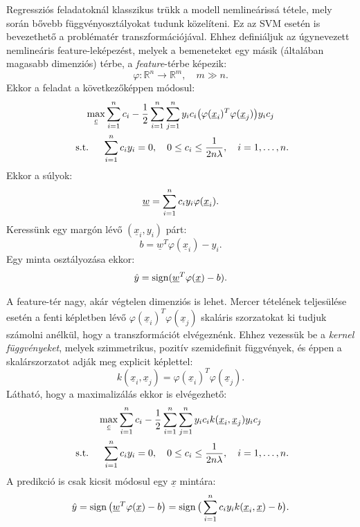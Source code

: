 




Regressziós feladatoknál klasszikus trükk a modell nemlineárissá tétele, mely során bővebb függvényosztályokat tudunk közelíteni. Ez az SVM esetén is bevezethető a problématér 
transzformációjával.
Ehhez definiáljuk az úgynevezett nemlineáris feature-leképezést, melyek a bemeneteket egy másik (általában magasabb dimenziós) térbe,
a \textit{feature}-térbe képezik:
\[
\varphi\colon \mathbb{R}^n \rightarrow \mathbb{R}^m, \quad m \gg n.
\]
Ekkor a feladat a következőképpen módosul:
\begin{multline*}
\max\limits_{\underline{c}} \sum\limits_{i=1}^{n}c_i - 
\frac{1}{2}\sum\limits_{{i}=1}^{n}\sum\limits_{{j}=1}^{n} y_i c_i \big(\varphi(\underline{x}_i)^T \varphi(\underline{x}_j)\big) y_i c_j \\
\text{ s.t. } \quad 
\sum\limits_{{i}=1}^{n} c_i y_i = 0, \quad
0 \leq c_i \leq \frac{1}{2n\lambda}, \quad 
i=1,\dots,n.
\end{multline*}
Ekkor a súlyok:
\[
\underline{w} = \sum\limits_{{i}=1}^{n} c_i y_i \varphi(\underline{x}_i).
\]
Keressünk egy margón lévő $ (\underline{x}_i, y_i) $ párt:
\[
b = \underline{w}^T \varphi(\underline{x}_i)  - y_i.
\]
Egy minta osztályozása ekkor:
\[
\hat{y} = \operatorname{sign}(\underline{w}^T \varphi(\underline{x}) - b).
\]



A feature-tér nagy, akár végtelen dimenziós is lehet. Mercer tételének teljesülése esetén a fenti képletben lévő
$ \varphi(\underline{x}_i)^T \varphi(\underline{x}_j) $ skaláris szorzatokat ki tudjuk számolni anélkül, hogy a transzformációt 
elvégeznénk.
Ehhez vezessük be a \textit{kernel függvényeket}, melyek szimmetrikus, pozitív szemidefinit függvények, és éppen a skalárszorzatot adják meg explicit képlettel:
\[
k(\underline{x}_i, \underline{x}_j) = \varphi(\underline{x}_i)^T \varphi(\underline{x}_j).
\]
Látható, hogy a maximalizálás ekkor is elvégezhető:
\begin{multline*}
\max\limits_{\underline{c}} \sum\limits_{i=1}^{n}c_i - 
\frac{1}{2}\sum\limits_{{i}=1}^{n}\sum\limits_{{j}=1}^{n} y_i c_i k(\underline{x}_i, \underline{x}_j) y_i c_j \\
\text{ s.t. } \quad 
\sum\limits_{{i}=1}^{n} c_i y_i = 0, \quad
0 \leq c_i \leq \frac{1}{2n\lambda}, \quad 
i=1,\dots,n.
\end{multline*}
A predikció is csak kicsit módosul egy $ \underline{x} $ mintára:
\[
\hat{y} = \operatorname{sign}\big(\underline{w}^T \varphi(\underline{x}) - b\big) = \operatorname{sign}\big(\sum\limits_{{i}=1}^{n} c_i y_i k(\underline{x}_i, \underline{x}) - b\big).
\]



